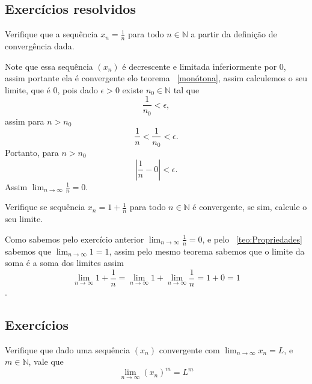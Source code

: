 \subsection*{Exercícios resolvidos}

\construirExeresol

\begin{exeresol}
    Verifique que a sequência $x_n = \frac{1}{n}$ para todo $n \in \mathbb{N}$ a 
    partir da definição de convergência dada.
\end{exeresol}

\begin{resol}
    Note que essa sequência $(x_n)$ é decrescente e limitada inferiormente por 0,
    assim portante ela é convergente elo teorema ~\ref{monótona}, assim calculemos
    o seu limite, que é $0$, pois dado $\epsilon > 0$ existe $n_0 \in \mathbb{N}$
    tal que
    $$\frac{1}{n_0}< \epsilon,$$
    assim para $n>n_0$
    $$\frac{1}{n} < \frac{1}{n_0} < \epsilon.$$
    Portanto, para $n>n_0$
    $$|\frac{1}{n} - 0| < \epsilon.$$
    Assim $\lim_{n \to \infty} \frac{1}{n} = 0$.
\end{resol}

\begin{exeresol}
    Verifique se sequência $x_n = 1 + \frac{1}{n}$ para todo $n \in \mathbb{N}$ 
    é convergente, se sim, calcule o seu limite.
\end{exeresol}
    
\begin{resol}
    Como sabemos pelo exercício anterior $\lim_{n \to \infty} \frac{1}{n} = 0$, e pelo
    ~\ref{teo:Propriedades} sabemos que $\lim_{n \to \infty} 1 = 1$, assim pelo mesmo teorema
    sabemos que o limite da soma é a soma dos limites assim
    $$\lim_{n \to \infty} 1 +\frac{1}{n} = \lim_{n \to \infty} 1 + \lim_{n \to \infty} \frac{1}{n} = 1 + 0 = 1$$.
\end{resol}

\subsection*{Exercícios}

\construirExer

\begin{exer}
    Verifique que dado uma sequência $(x_n)$ convergente com $\lim_{n \to \infty} x_n = L$,
    e $m \in \mathbb{N}$, vale que
    $$ \lim_{n \to \infty} (x_n)^m = L^m$$
\end{exer}


